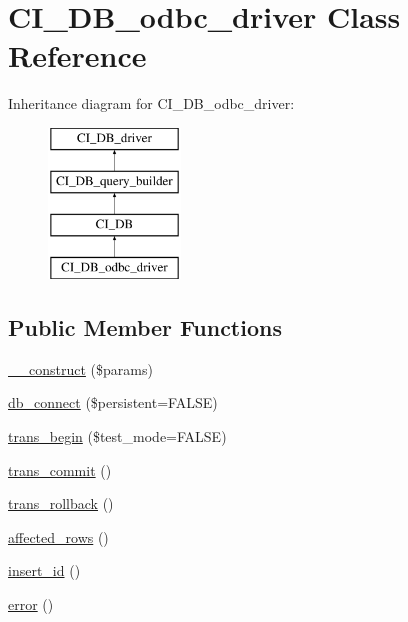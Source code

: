 \hypertarget{class_c_i___d_b__odbc__driver}{}\section{C\+I\+\_\+\+D\+B\+\_\+odbc\+\_\+driver Class Reference}
\label{class_c_i___d_b__odbc__driver}
Inheritance diagram for C\+I\+\_\+\+D\+B\+\_\+odbc\+\_\+driver\+:\begin{figure}[H]
\begin{center}
\leavevmode
\includegraphics[height=4.000000cm]{class_c_i___d_b__odbc__driver}
\end{center}
\end{figure}
\subsection*{Public Member Functions}
\begin{DoxyCompactItemize}
\item 
\hyperlink{class_c_i___d_b__odbc__driver_a9162320adff1a1a4afd7f2372f753a3e}{\+\_\+\+\_\+construct} (\$params)
\item 
\hyperlink{class_c_i___d_b__odbc__driver_a52bf595e79e96cc0a7c907a9b45aeb4d}{db\+\_\+connect} (\$persistent=F\+A\+L\+S\+E)
\item 
\hyperlink{class_c_i___d_b__odbc__driver_a90e153cf190d273336d77cce930587e1}{trans\+\_\+begin} (\$test\+\_\+mode=F\+A\+L\+S\+E)
\item 
\hyperlink{class_c_i___d_b__odbc__driver_af4fbdcdace4aa94a139b64877601fe9b}{trans\+\_\+commit} ()
\item 
\hyperlink{class_c_i___d_b__odbc__driver_a53f76d4dfcd6ac04fb653982442aeef8}{trans\+\_\+rollback} ()
\item 
\hyperlink{class_c_i___d_b__odbc__driver_a77248aaad33eb132c04cc4aa3f4bc8cb}{affected\+\_\+rows} ()
\item 
\hyperlink{class_c_i___d_b__odbc__driver_a933f2cde8dc7f87875e257d0a4902e99}{insert\+\_\+id} ()
\item 
\hyperlink{class_c_i___d_b__odbc__driver_a43b8d30b879d4f09ceb059b02af2bc02}{error} ()
\end{DoxyCompactItemize}
